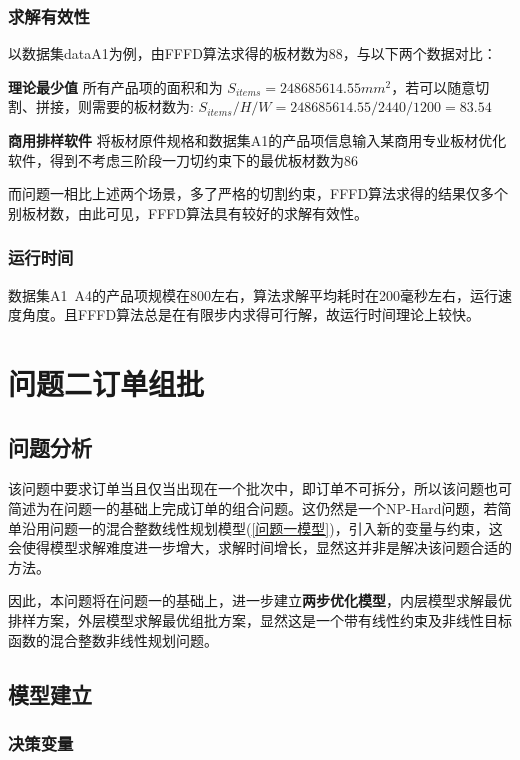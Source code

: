 \documentclass[bwprint]{gmcmthesis}
\begin{document}
\subsubsection{求解有效性}
	
	以数据集dataA1为例，由FFFD算法求得的板材数为88，与以下两个数据对比：
	
	\textbf{理论最少值} \quad 所有产品项的面积和为 $ S_{items} = 248685614.55 mm^2 $，若可以随意切割、拼接，则需要的板材数为: $ S_{items}/H/W = 248685614.55/2440/1200 = 83.54 $
	
	\textbf{商用排样软件} \quad 将板材原件规格和数据集A1的产品项信息输入某商用专业板材优化软件，得到不考虑三阶段一刀切约束下的最优板材数为86
	
	而问题一相比上述两个场景，多了严格的切割约束，FFFD算法求得的结果仅多个别板材数，由此可见，FFFD算法具有较好的求解有效性。
	
\subsubsection{运行时间}
	 
	数据集A1~A4的产品项规模在800左右，算法求解平均耗时在200毫秒左右，运行速度角度。且FFFD算法总是在有限步内求得可行解，故运行时间理论上较快。
		
	

\section{问题二订单组批}

\subsection{问题分析}
该问题中要求订单当且仅当出现在一个批次中，即订单不可拆分，所以该问题也可简述为在问题一的基础上完成订单的组合问题。这仍然是一个NP-Hard问题，若简单沿用问题一的混合整数线性规划模型(\ref{问题一模型})，引入新的变量与约束，这会使得模型求解难度进一步增大，求解时间增长，显然这并非是解决该问题合适的方法。

因此，本问题将在问题一的基础上，进一步建立\textbf{两步优化模型}，内层模型求解最优排样方案，外层模型求解最优组批方案，显然这是一个带有线性约束及非线性目标函数的混合整数非线性规划问题。

\subsection{模型建立}


\subsubsection{决策变量}
\end{document}
